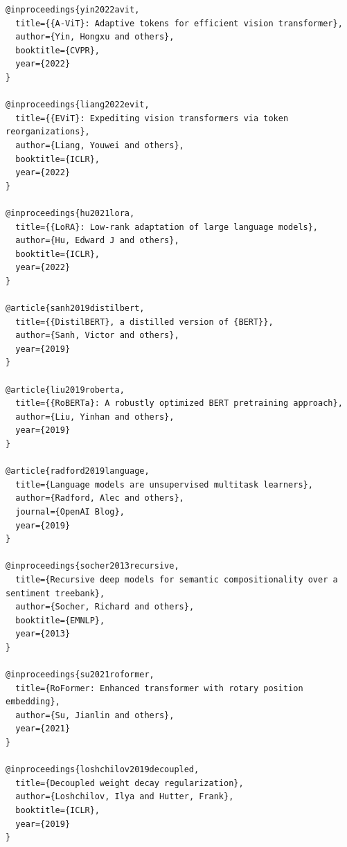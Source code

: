 \begin{lstlisting}
@inproceedings{yin2022avit,
  title={{A-ViT}: Adaptive tokens for efficient vision transformer},
  author={Yin, Hongxu and others},
  booktitle={CVPR},
  year={2022}
}

@inproceedings{liang2022evit,
  title={{EViT}: Expediting vision transformers via token reorganizations},
  author={Liang, Youwei and others},
  booktitle={ICLR},
  year={2022}
}

@inproceedings{hu2021lora,
  title={{LoRA}: Low-rank adaptation of large language models},
  author={Hu, Edward J and others},
  booktitle={ICLR},
  year={2022}
}

@article{sanh2019distilbert,
  title={{DistilBERT}, a distilled version of {BERT}},
  author={Sanh, Victor and others},
  year={2019}
}

@article{liu2019roberta,
  title={{RoBERTa}: A robustly optimized BERT pretraining approach},
  author={Liu, Yinhan and others},
  year={2019}
}

@article{radford2019language,
  title={Language models are unsupervised multitask learners},
  author={Radford, Alec and others},
  journal={OpenAI Blog},
  year={2019}
}

@inproceedings{socher2013recursive,
  title={Recursive deep models for semantic compositionality over a sentiment treebank},
  author={Socher, Richard and others},
  booktitle={EMNLP},
  year={2013}
}

@inproceedings{su2021roformer,
  title={RoFormer: Enhanced transformer with rotary position embedding},
  author={Su, Jianlin and others},
  year={2021}
}

@inproceedings{loshchilov2019decoupled,
  title={Decoupled weight decay regularization},
  author={Loshchilov, Ilya and Hutter, Frank},
  booktitle={ICLR},
  year={2019}
}
\end{lstlisting}

